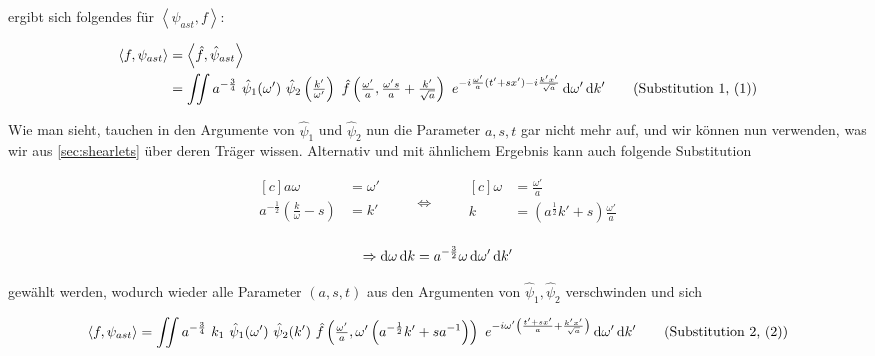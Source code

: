 ergibt sich folgendes für $\left<\psi_{ast}, f\right>$:

\begin{align}
    \left\langle f , \psi_{ast}\right\rangle
    &=  \left\langle \hat f, \hat\psi_{ast}\right\rangle \nonumber \\
    &=  \iint a^{-\frac{3}{4}}~\hat \psi_1(\omega') ~\hat \psi_2 \left(\tfrac{k'}{\omega'}\right)
    ~\hat f \left(\tfrac{\omega'}{a}, \tfrac{\omega' s}{a} + \tfrac{k'}{\sqrt{a}}\right)
    ~e^{-i\frac{\omega'}{a}(t'+sx') - i \frac{k' x'}{\sqrt a}}
    \d \omega' \d k'
\refstepcounter{equation}
\tag{Substitution 1, (\theequation)}
\label{eq:substitution1}
\end{align}

Wie man sieht, tauchen in den Argumente von $\hat\psi_1$ und $\hat\psi_2$ nun die Parameter $a,s,t$ gar nicht mehr auf, und wir können nun verwenden, was wir aus \eqref{sec:shearlets} über deren Träger wissen.
Alternativ und mit ähnlichem Ergebnis kann auch folgende Substitution

\begin{equation}
\begin{aligned}[c]
a \omega &= \omega'\\
a^{-\frac{1}{2}} \left(\frac{k}{\omega} - s\right) &= k'\\
\end{aligned}
\qquad\Longleftrightarrow\qquad
\begin{aligned}[c]
\omega &= \frac{\omega'}{a}\\
k &= \left( a^{\frac{1}{2}} k' +s \right) \frac{\omega'}{a}\\
\end{aligned}
\label{eq:substitution2_coords}
\end{equation}

\begin{equation*}
\Rightarrow
\mathop{}\!\mathrm{d} \omega \mathop{}\!\mathrm{d} k = a^{-\frac{3}{2}} \omega \mathop{}\!\mathrm{d} \omega' \mathop{}\!\mathrm{d} k'
\end{equation*}

gewählt werden, wodurch wieder alle Parameter $(a,s,t)$ aus den Argumenten von $\hat\psi_1, \hat\psi_2$
verschwinden und sich

\begin{align}
    \left<f, \psi_{ast}\right>
    =  \iint a^{-\frac{3}{4}}~ k_1~ \hat \psi_1(\omega')~ \hat \psi_2 (k')~
    \hat f \left(\tfrac{\omega'}{a}, \omega' \left(a^{-\frac{1}{2}}k' + s a^{-1}\right)\right)
    ~e^{-i \omega' \left(\frac{t'+s x'}{a} + \frac{k' x'}{\sqrt{a}}\right)}
    \d \omega' \d k'
\refstepcounter{equation}
\tag{Substitution 2, (\theequation)}
\label{eq:substitution2}
\end{align}

